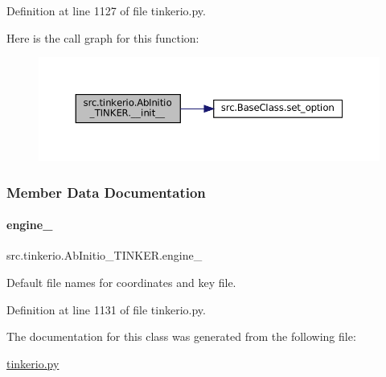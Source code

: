 Definition at line 1127 of file tinkerio.\+py.

Here is the call graph for this function\+:
\nopagebreak
\begin{figure}[H]
\begin{center}
\leavevmode
\includegraphics[width=350pt]{classsrc_1_1tinkerio_1_1AbInitio__TINKER_a1bc9723a844cef97a7508c9a2959f60f_cgraph}
\end{center}
\end{figure}


\subsubsection{Member Data Documentation}
\mbox{\label{classsrc_1_1tinkerio_1_1AbInitio__TINKER_a24062e5d574569368efd4e9f020d0d03}} 
\paragraph{\texorpdfstring{engine\+\_\+}{engine\_}}
{\footnotesize\ttfamily src.\+tinkerio.\+Ab\+Initio\+\_\+\+T\+I\+N\+K\+E\+R.\+engine\+\_\+}



Default file names for coordinates and key file. 



Definition at line 1131 of file tinkerio.\+py.



The documentation for this class was generated from the following file\+:\begin{DoxyCompactItemize}
\item 
\hyperlink{tinkerio_8py}{tinkerio.\+py}\end{DoxyCompactItemize}
